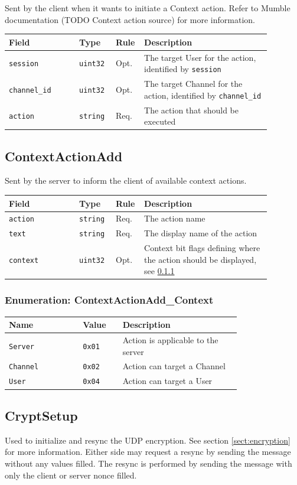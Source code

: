\documentclass[11pt]{article} %
\newenvironment{mumbleMessageEx}
{%
	\small
	\renewcommand\arraystretch{1.5}
	\begin{tabular}{p{0.25\linewidth}p{0.13\linewidth}p{0.05\linewidth}p{0.45\linewidth}}
	Field & Type & Rule & Description \\
	\hline
}
{%
	\end{tabular}
	\renewcommand\arraystretch{1.0}
}
\newcommand{\mumbleMessageExItem}[4]{ \texttt{#1} & \texttt{#2} & #3 & #4 \\ }
\newenvironment{mumbleEnum}
{%
	\small
	\renewcommand\arraystretch{1.5}
	\begin{tabular}{p{0.25\linewidth}p{0.13\linewidth}p{0.4\linewidth}}
	Name & Value & Description \\
	\hline
}
{%
	\end{tabular}
	\renewcommand\arraystretch{1.0}
}
\newcommand{\mumbleEnumItem}[3]{ \texttt{#1} & \texttt{#2} & #3 \\ }
\begin{document}
Sent by the client when it wants to initiate a Context action. Refer to Mumble documentation (TODO Context action source) for more information.

\begin{mumbleMessageEx}
\mumbleMessageExItem{session}{uint32}{Opt.}{The target User for the action, identified by \texttt{session}}
\mumbleMessageExItem{channel\_id}{uint32}{Opt.}{The target Channel for the action, identified by \texttt{channel\_id}}
\mumbleMessageExItem{action}{string}{Req.}{The action that should be executed}
\end{mumbleMessageEx}

\subsection{ContextActionAdd}
\label{msg:contextActionAdd}

Sent by the server to inform the client of available context actions.

\begin{mumbleMessageEx}
\mumbleMessageExItem{action}{string}{Req.}{The action name}
\mumbleMessageExItem{text}{string}{Req.}{The display name of the action}
\mumbleMessageExItem{context}{uint32}{Opt.}{Context bit flags defining where the action should be displayed, see \ref{msg:contextActionAdd:context}}
\end{mumbleMessageEx}

\subsubsection{Enumeration: ContextActionAdd\_Context}
\label{msg:contextActionAdd:context}

\begin{mumbleEnum}
\mumbleEnumItem{Server}{0x01}{Action is applicable to the server}
\mumbleEnumItem{Channel}{0x02}{Action can target a Channel}
\mumbleEnumItem{User}{0x04}{Action can target a User}
\end{mumbleEnum}

\subsection{CryptSetup}
\label{msg:cryptSetup}

Used to initialize and resync the UDP encryption. See section \ref{sect:encryption} for more information. Either side may request a resync by sending the message without any values filled. The resync is performed by sending the message with only the client or server nonce filled.
\end{document}
